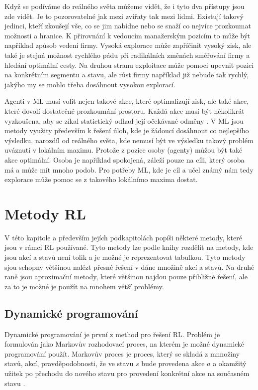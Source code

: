 \documentclass{article}
\begin{document}
Když se podíváme do reálného světa můžeme vidět, že i tyto dva přístupy jsou zde vidět. Je to pozorovatelné jak mezi zvířaty tak mezi lidmi. Existují takový jedinci, kteří zkoušejí vše, co se jim nabídne nebo se snaží co nejvíce prozkoumat možnosti a hranice. K přirovnání k vedoucím manažerským pozicím to může být například způsob vedení firmy. Vysoká explorace může zapříčinit vysoký zisk, ale také je stejná možnost rychlého pádu při radikálních změnách směřování firmy a hledání optimální cesty. Na druhou stranu exploitace může pomoci upevnit pozici na konkrétním segmentu a stavu, ale růst firmy například již nebude tak rychlý, jakýho my se mohlo třeba dosáhnout vysokou explorací.

Agenti v ML musí volit nejen takové akce, které optimalizují zisk, ale také akce, které dovolí dostatečné prozkoumání prostoru. Každá akce musí být několikrát vyzkoušena, aby se zíkal statictický odhad její očekávané odměny \cite{sutton1998introduction}. V ML jsou metody využity především k řešení úloh, kde je žádoucí dosáhnout co nejlepšího výsledku, narozdíl od reálného světa, kde nemusí být ve výsledku takový problém uváznutí v lokálním maximu. Protože z pozice osoby (agenty) můžou být také akce optimální. Osoba je například spokojená, záleží pouze na cíli, který osoba má a může mít mnoho podob. Pro potřeby ML, kde je cíl a učel známý nám tedy explorace může pomoc se z takového lokálnímo maxima dostat. 


\section{Metody RL}
V této kapitole a především jejích podkapitolách popíši některé metody, které jsou v rámci RL používané. Tyto metody lze podle knihy \cite{sutton1998introduction} rozdělit na metody, kde jsou akcí a stavů není tolik a je možné je reprezentovat tabulkou. Tyto metody sjou schopny většinou nalézt přesné řešení v dáne množině akcí a stavů. Na druhé  raně jsou aproximační metody, které většinou najdou pouze přibližné řešení, ale za to je možné je použít na mnohem větší problémy. 


\subsection{Dynamické programování}
Dynamické programování je první z method pro řešení RL. Problém je formulován jako Markovův rozhodovací proces, na kterém je možné dynamické programování použít. Markovův proces je proces, který se skladá z mnnožiny stavů, akcí, pravděpodobnosti, že ve stavu $s$ bude provedena akce $a$ a okamžitý užitek po přechodu do nového stavu pro provedení konkrétní akce na současném stavu \cite{sutton1998introduction}. 
\end{document}
